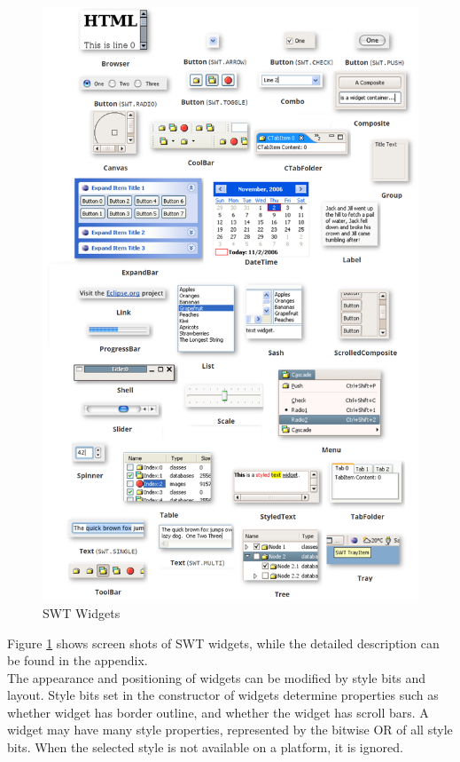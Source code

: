 \begin{figure}
\centering
\caption{SWT Widgets \cite{swtwidgets}}
\label{fig:swt}
\includegraphics[width=1\textwidth]{images/swt.png}
\end{figure}
Figure \ref{fig:swt} shows screen shots of SWT widgets, while the detailed description can be found in the appendix.\\

The appearance and positioning of widgets can be modified by style bits and layout. \cite{swtlayout} Style bits set in the constructor of widgets determine properties such as whether widget has border outline, and whether the widget has scroll bars. A widget may have many style properties, represented by the bitwise OR of all style bits. When the selected style is not available on a platform, it is ignored.\\

